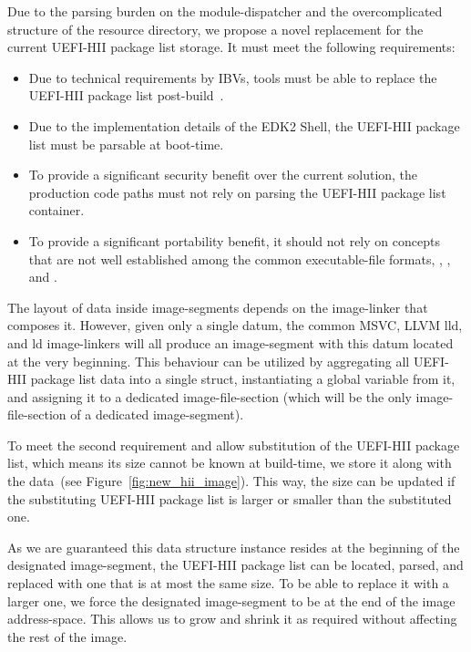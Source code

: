 Due to the parsing burden on the \gls{module-dispatcher} and the overcomplicated structure of the  resource directory, we propose a novel replacement for the current \gls{UEFI-HII} package list storage. It must meet the following requirements:
\begin{itemize}
  \item Due to technical requirements by \glspl{IBV}, tools must be able to replace the \gls{UEFI-HII} package list post-build~\cite{hii-mail}.
  \item Due to the implementation details of the \gls{EDK2} Shell, the \gls{UEFI-HII} package list must be parsable at boot-time.
  \item To provide a significant security benefit over the current solution, the production code paths must not rely on parsing the \gls{UEFI-HII} package list container.
  \item To provide a significant portability benefit, it should not rely on concepts that are not well established among the common \gls{executable-file} formats, , , and .
\end{itemize}

The layout of data inside \glspl{image-segment} depends on the \gls{image-linker} that composes it. However, given only a single datum, the common \gls{MSVC}, LLVM lld, and  ld \glspl{image-linker} will all produce an \gls{image-segment} with this datum located at the very beginning. This behaviour can be utilized by aggregating all \gls{UEFI-HII} package list data into a single  struct, instantiating a global variable from it, and assigning it to a dedicated \gls{image-file-section} (which will be the only \gls{image-file-section} of a dedicated \gls{image-segment}).

To meet the second requirement and allow substitution of the \gls{UEFI-HII} package list, which means its size cannot be known at build-time, we store it along with the data~(see Figure~\ref{fig:new_hii_image}). This way, the size can be updated if the substituting \gls{UEFI-HII} package list is larger or smaller than the substituted one.

As we are guaranteed this data structure instance resides at the beginning of the designated \gls{image-segment}, the \gls{UEFI-HII} package list can be located, parsed, and replaced with one that is at most the same size. To be able to replace it with a larger one, we force the designated \gls{image-segment} to be at the end of the \gls{image} \gls{address-space}. This allows us to grow and shrink it as required without affecting the rest of the \gls{image}.

